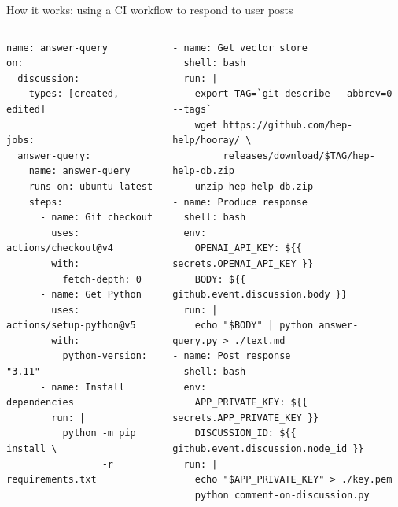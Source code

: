 \documentclass[aspectratio=169]{beamer}
\begin{document}
\begin{frame}[fragile]{How it works: using a CI workflow to respond to user posts}
\scriptsize
\vspace{-0.1 cm}
\begin{columns}[t]
\begin{verbatim}
name: answer-query
on:
  discussion:
    types: [created, edited]

jobs:
  answer-query:
    name: answer-query
    runs-on: ubuntu-latest
    steps:
      - name: Git checkout
        uses: actions/checkout@v4
        with:
          fetch-depth: 0
      - name: Get Python
        uses: actions/setup-python@v5
        with:
          python-version: "3.11"
      - name: Install dependencies
        run: |
          python -m pip install \
                 -r requirements.txt
\end{verbatim}

\begin{verbatim}
- name: Get vector store
  shell: bash
  run: |
    export TAG=`git describe --abbrev=0 --tags`
    wget https://github.com/hep-help/hooray/ \
         releases/download/$TAG/hep-help-db.zip
    unzip hep-help-db.zip
- name: Produce response
  shell: bash
  env:
    OPENAI_API_KEY: ${{ secrets.OPENAI_API_KEY }}
    BODY: ${{ github.event.discussion.body }}
  run: |
    echo "$BODY" | python answer-query.py > ./text.md
- name: Post response
  shell: bash
  env:
    APP_PRIVATE_KEY: ${{ secrets.APP_PRIVATE_KEY }}
    DISCUSSION_ID: ${{ github.event.discussion.node_id }}
  run: |
    echo "$APP_PRIVATE_KEY" > ./key.pem
    python comment-on-discussion.py
\end{verbatim}
\end{columns}
\end{frame}
\end{document}
